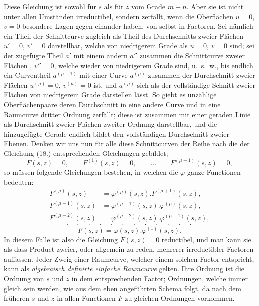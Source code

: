 \documentclass{article}
\begin{document}

Diese Gleichung ist sowohl für $s$ als für $z$ vom Grade $m+n$. Aber sie ist nicht unter allen Umständen irreductibel, sondern zerfällt, wenn die Oberflächen $u=0$, $v=0$ besondere Lagen gegen einander haben, von selbst in Factoren. Sei nämlich ein Theil der Schnittcurve zugleich als Theil des Durchschnitts zweier Flächen $u'=0$, $v'=0$ darstellbar, welche von niedrigerem Grade als $u=0$, $v=0$ sind; sei der zugefügte Theil $a'$ mit einem andern $a''$ zusammen die Schnittcurve zweier Flächen , $v''=0$, welche wieder von niedrigerem Grade sind, u.\ s.\ w., bis endlich ein Curventheil $a^{(\mu-1)}$ mit einer Curve $a^{(\mu)}$ zusammen der Durchschnitt zweier Flächen $u^{(\mu)}=0$, $v^{(\mu)}=0$ ist, und $a^{(\mu)}$ sich als der vollständige Schnitt zweier Flächen von niedrigerem Grade darstellen lässt. So giebt es unzählige Oberflächenpaare deren Durchschnitt in eine andere Curve und in eine Raumcurve dritter Ordnung zerfällt; diese ist zusammen mit einer geraden Linie als Durchschnitt zweier Flächen zweiter Ordnung darstellbar, und die hinzugefügte Gerade endlich bildet den vollständigen Durchschnitt zweier Ebenen. Denken wir uns nun für alle diese Schnittcurven der Reihe nach die der Gleichung (18.) entsprechenden Gleichungen gebildet;
\[
F(s,z)=0, \qquad F^{(1)}(s,z)=0, \qquad \ldots \qquad F^{(\mu+1)}(s,z)=0,
\]
so müssen folgende Gleichungen bestehen, in welchen die $\varphi$ ganze Functionen bedeuten:
\[
\begin{aligned}
F^{(\mu)}(s,z) &= \varphi^{(\mu)}(s,z).F^{(\mu+1)}(s,z),\\
F^{(\mu-1)}(s,z) &= \varphi^{(\mu-1)}(s,z).\varphi^{(\mu)}(s,z),\\
F^{(\mu-2)}(s,z) &= \varphi^{(\mu-2)}(s,z).\varphi^{(\mu-1)}(s,z),
\end{aligned}
\]
\[
\cdot\quad\cdot\quad\cdot\quad\cdot\quad\cdot\quad\cdot\quad\cdot\quad\cdot\quad\cdot\quad\cdot\quad\cdot\quad\cdot
\]
\[
F(s,z) = \varphi(s,z).\varphi^{(1)}(s,z).
\]
In diesem Falle ist also die Gleichung $F(s,z)=0$ reductibel, und man kann sie als dass Product zweier, oder allgemein zu reden, mehrerer irreductibler Factoren auffassen. Jeder Zweig einer Raumcurve, welcher einem solchen Factor entspricht, kann als \emph{algebraisch definirte einfache Raumcurve} gelten. Ihre Ordnung ist die Ordnung von $s$ und $z$ in dem entsprechenden Factor; Ordnungen, welche immer gleich sein werden, wie aus dem eben angeführten Schema folgt, da nach dem früheren $s$ und $z$ in allen Functionen $F$ zu gleichen Ordnungen vorkommen.
\end{document}
